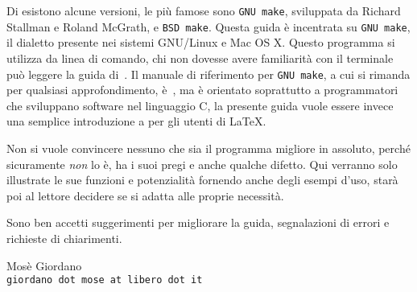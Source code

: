 Di  esistono alcune versioni, le più famose sono
\texttt{GNU make}, sviluppata da Richard Stallman e Roland McGrath, e
\texttt{BSD make}.  Questa guida è incentrata su \texttt{GNU make}, il dialetto
presente nei sistemi GNU/Linux e Mac OS X.  Questo programma si utilizza da
linea di comando, chi non dovesse avere familiarità con il terminale può leggere
la guida di~\cite{giacomelli:console}.  Il manuale di riferimento per
\texttt{GNU make}, a cui si rimanda per qualsiasi approfondimento,
è~\cite{gnu:make}, ma è orientato soprattutto a programmatori che sviluppano
software nel linguaggio C, la presente guida vuole essere invece una semplice
introduzione a  per gli utenti di \LaTeX{}.

Non si vuole convincere nessuno che  sia il programma migliore
in assoluto, perché sicuramente \emph{non} lo è, ha i suoi pregi e anche qualche
difetto.  Qui verranno solo illustrate le sue funzioni e potenzialità fornendo
anche degli esempi d'uso, starà poi al lettore decidere se  si
adatta alle proprie necessità.

Sono ben accetti suggerimenti per migliorare la guida, segnalazioni di errori e
richieste di chiarimenti.

\begin{flushright}
\begin{minipage}{0.6\textwidth}\centering
Mosè Giordano \\
\texttt{giordano dot mose at libero dot it}
\end{minipage}
\end{flushright}

